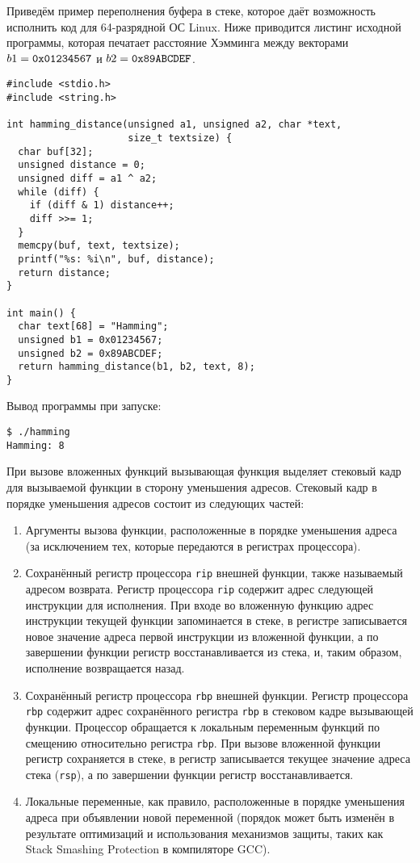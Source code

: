 Приведём пример переполнения буфера в стеке, которое даёт возможность исполнить код для 64-разрядной ОС Linux. Ниже приводится листинг исходной программы, которая печатает расстояние Хэмминга между векторами $b1 = \text{\texttt{0x01234567}}$ и $b2 = \text{\texttt{0x89ABCDEF}}$.

\begin{verbatim}
#include <stdio.h>
#include <string.h>

int hamming_distance(unsigned a1, unsigned a2, char *text,
                     size_t textsize) {
  char buf[32];
  unsigned distance = 0;
  unsigned diff = a1 ^ a2;
  while (diff) {
    if (diff & 1) distance++;
    diff >>= 1;
  }
  memcpy(buf, text, textsize);
  printf("%s: %i\n", buf, distance);
  return distance;
}

int main() {
  char text[68] = "Hamming";
  unsigned b1 = 0x01234567;
  unsigned b2 = 0x89ABCDEF;
  return hamming_distance(b1, b2, text, 8);
}
\end{verbatim}

Вывод программы при запуске:
\begin{verbatim}
$ ./hamming
Hamming: 8
\end{verbatim}

При вызове вложенных функций вызывающая функция выделяет стековый кадр для вызываемой функции в сторону уменьшения адресов. Стековый кадр в порядке уменьшения адресов состоит из следующих частей:
\begin{enumerate}
    \item Аргументы вызова функции, расположенные в порядке уменьшения адреса (за исключением тех, которые передаются в регистрах процессора).
    \item Сохранённый регистр процессора \texttt{rip} внешней функции, также называемый адресом возврата. Регистр процессора \texttt{rip} содержит адрес следующей инструкции для исполнения. При входе во вложенную функцию адрес инструкции текущей функции запоминается в стеке, в регистре записывается новое значение адреса первой инструкции из вложенной функции, а по завершении функции регистр восстанавливается из стека, и, таким образом, исполнение возвращается назад.
    \item Сохранённый регистр процессора \texttt{rbp} внешней функции. Регистр процессора \texttt{rbp} содержит адрес сохранённого регистра \texttt{rbp} в стековом кадре вызывающей функции. Процессор обращается к локальным переменным функций по смещению относительно регистра \texttt{rbp}. При вызове вложенной функции регистр сохраняется в стеке, в регистр записывается текущее значение адреса стека (\texttt{rsp}), а по завершении функции регистр восстанавливается.
    \item Локальные переменные, как правило, расположенные в порядке уменьшения адреса при объявлении новой переменной (порядок может быть изменён в результате оптимизаций и использования механизмов защиты, таких как Stack Smashing Protection в компиляторе GCC).
\end{enumerate}

